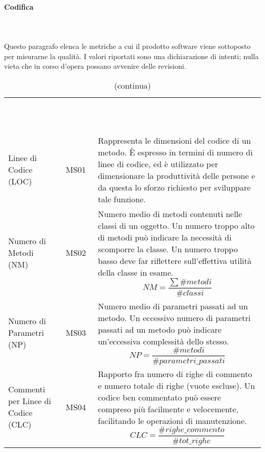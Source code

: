 			\paragraph{Codifica} \mbox{} \\ \mbox{} \\
			Questo paragrafo elenca le metriche a cui il prodotto software viene sottoposto per misurarne la qualità.
			I valori riportati sono una dichiarazione di intenti; nulla vieta che in corso d'opera possano avvenire delle revisioni.
			\begin{longtable}{ C{4.5cm} c L{9.5cm} }
	\caption{Metriche del software}\\
		\textcolor{white}{\textbf{Nome}} & \textcolor{white}{\textbf{Codice}} & \centerline{\textcolor{white}{\textbf{Descrizione}}} \\
		\endfirsthead
		\caption[]{(continua)} \\
		\textcolor{white}{\textbf{Nome}} & \textcolor{white}{\textbf{Codice}} & \centerline{\textcolor{white}{\textbf{Descrizione}}} \\
		\endhead
		\label{par:MS01}Linee di Codice (LOC) & MS01 & Rappresenta  le  dimensioni  del  codice di un metodo. È espresso in termini di numero di linee di codice, ed è utilizzato per dimensionare la produttività delle persone e da questa lo sforzo richiesto per sviluppare tale funzione. \\
		Numero di Metodi (NM)  & MS02 & Numero medio di metodi contenuti nelle classi di un oggetto. Un numero troppo alto di metodi può indicare la necessità di scomporre la classe. Un numero troppo basso deve far riflettere sull'effettiva utilità della classe in esame. 
		\[ NM =\frac{\sum\#metodi}{\#classi}  \] \\
		Numero di Parametri (NP) & MS03 & Numero medio di parametri passati ad un metodo. Un eccessivo numero di parametri passati ad un metodo può
indicare un'eccessiva complessità dello stesso.
\[ NP =\frac{\#metodi}{\#parametri\_passati}  \] \\
		Commenti per Linee di \newline Codice (CLC) & MS04 & Rapporto fra numero di righe di commento e numero totale di righe (vuote escluse). Un codice ben commentato può essere compreso più facilmente e velocemente, facilitando le operazioni di manutenzione. 
		\[ CLC = \frac{\#righe\_commento}{\#tot\_righe}\] \\
	\end{longtable}
